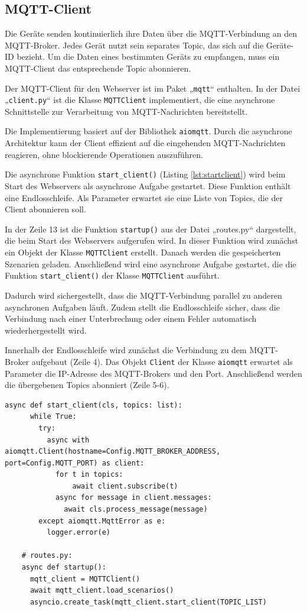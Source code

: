 \documentclass[12pt, letterpaper]{article}
\begin{document}
  \subsection{MQTT-Client}
  \par Die Geräte senden kontinuierlich ihre Daten über die MQTT-Verbindung an den MQTT-Broker. Jedes Gerät nutzt sein separates Topic, das sich auf die Geräte-ID bezieht. Um die Daten eines bestimmten Geräts zu empfangen, muss ein MQTT-Client das entsprechende Topic abonnieren.
  \par Der MQTT-Client für den Webserver ist im Paket „\texttt{mqtt}“ enthalten. In der Datei „\texttt{client.py}“ ist die Klasse \texttt{MQTTClient} implementiert, die eine asynchrone Schnittstelle zur Verarbeitung von MQTT-Nachrichten bereitstellt. 
  \par Die Implementierung basiert auf der Bibliothek \texttt{aiomqtt}. Durch die asynchrone Architektur kann der Client effizient auf die eingehenden MQTT-Nachrichten reagieren, ohne blockierende Operationen auszuführen.
  \par Die asynchrone Funktion \texttt{start\_client()} (Listing \ref{lst:startclient}) wird beim Start des Webservers als asynchrone Aufgabe gestartet. Diese Funktion enthält eine Endlosschleife. Als Parameter erwartet sie eine Liste von Topics, die der Client abonnieren soll. 
  \par In der Zeile 13 ist die Funktion \texttt{startup()} aus der Datei „routes.py“ dargestellt, die beim Start des Webservers aufgerufen wird. In dieser Funktion wird zunächst ein Objekt der Klasse \texttt{MQTTClient} erstellt. Danach werden die gespeicherten Szenarien geladen. Anschließend wird eine asynchrone Aufgabe gestartet, die die Funktion \texttt{start\_client()} der Klasse \texttt{MQTTClient} ausführt.
  \par Dadurch wird sichergestellt, dass die MQTT-Verbindung parallel zu anderen asynchronen Aufgaben läuft. Zudem stellt die Endlosschleife sicher, dass die Verbindung nach einer Unterbrechung oder einem Fehler automatisch wiederhergestellt wird.
  \par Innerhalb der Endlosschleife wird zunächst die Verbindung zu dem MQTT-Broker aufgebaut (Zeile 4). Das Objekt \texttt{Client} der Klasse \texttt{aiomqtt} erwartet als Parameter die IP-Adresse des MQTT-Brokers und den Port. Anschließend werden die übergebenen Topics abonniert (Zeile 5-6). 
  \begin{lstlisting}[style=mypython, label={lst:startclient}, caption={client.py: start\_client}]
    async def start_client(cls, topics: list):
      while True:
        try:
          async with aiomqtt.Client(hostname=Config.MQTT_BROKER_ADDRESS, port=Config.MQTT_PORT) as client:
            for t in topics:
                await client.subscribe(t)
            async for message in client.messages:
              await cls.process_message(message)
        except aiomqtt.MqttError as e:
          logger.error(e)
    
    # routes.py:
    async def startup():
      mqtt_client = MQTTClient()
      await mqtt_client.load_scenarios()
      asyncio.create_task(mqtt_client.start_client(TOPIC_LIST)
  \end{lstlisting}
\end{document}
